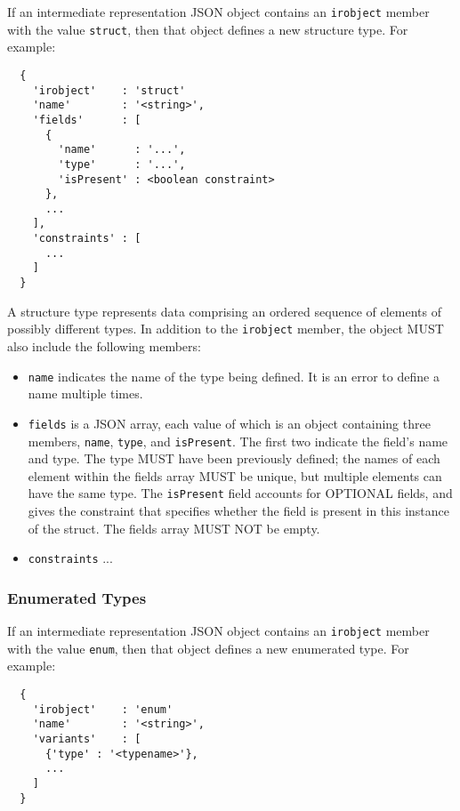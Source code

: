 \documentclass[twocolumn,a4paper]{article}
\begin{document}
If an intermediate representation JSON object contains an \texttt{irobject}
member with the value \texttt{struct}, then that object defines a new
structure type. For example:

\begin{verbatim}
  {
    'irobject'    : 'struct'
    'name'        : '<string>',
    'fields'      : [
      {
        'name'      : '...',
        'type'      : '...',
        'isPresent' : <boolean constraint>
      },
      ...
    ],
    'constraints' : [
      ...
    ]
  }
\end{verbatim}

A structure type represents data comprising an ordered sequence of elements
of possibly different types. In addition to the \texttt{irobject} member, 
the object MUST also include the following members:
\begin{itemize}
  \item \texttt{name} indicates the name of the type being defined. It is
    an error to define a name multiple times.
  \item \texttt{fields} is a JSON array, each value of which is an object
    containing three members, \texttt{name}, \texttt{type}, and \texttt{isPresent}.
    The first two indicate the field's name and type. The type MUST have
    been previously defined; the names of each element within the fields
    array MUST be unique, but multiple elements can have the same type.
    The \texttt{isPresent} field accounts for OPTIONAL fields, and gives
    the constraint that specifies whether the field is present in this
    instance of the struct.
    The fields array MUST NOT be empty.
  \item \texttt{constraints} ...
\end{itemize}

\subsubsection{Enumerated Types}

If an intermediate representation JSON object contains an \texttt{irobject}
member with the value \texttt{enum}, then that object defines a new enumerated
type. For example:

\begin{verbatim}
  {
    'irobject'    : 'enum'
    'name'        : '<string>',
    'variants'    : [
      {'type' : '<typename>'},
      ...
    ]
  }
\end{verbatim}
\end{document}
